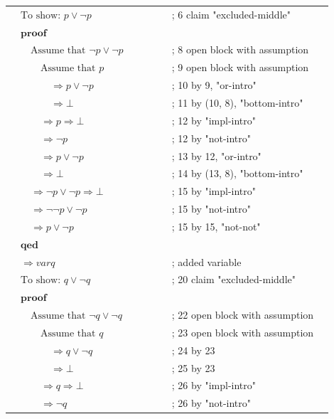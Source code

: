 \documentclass{article}
\begin{document}
\begin{flushleft}
\begin{tabular}{L{0.45\linewidth} L{0.45\linewidth}}

$ \quad \text{To show: } p \lor \lnot p  $ & ; 6 claim "excluded-middle" \\
$ \quad \textbf{proof} $ \\
$ \quad\quad \text{Assume that } \lnot p \lor \lnot p  $ & ; 8 open block with assumption \\
$ \quad\quad\quad \text{Assume that } p $ & ; 9 open block with assumption \\
$ \quad\quad\quad\quad \Rightarrow p \lor \lnot p  $ & ; 10 by 9, "or-intro" \\
$ \quad\quad\quad\quad \Rightarrow \bot $ & ; 11 by (10, 8), "bottom-intro" \\
$ \quad\quad\quad \Rightarrow p \Rightarrow \bot $ & ; 12 by "impl-intro" \\
$ \quad\quad\quad \Rightarrow \lnot p $ & ; 12 by "not-intro" \\
$ \quad\quad\quad \Rightarrow p \lor \lnot p  $ & ; 13 by 12, "or-intro" \\
$ \quad\quad\quad \Rightarrow \bot $ & ; 14 by (13, 8), "bottom-intro" \\
$ \quad\quad \Rightarrow \lnot p \lor \lnot p \Rightarrow \bot $ & ; 15 by "impl-intro" \\
$ \quad\quad \Rightarrow \lnot \lnot p \lor \lnot p  $ & ; 15 by "not-intro" \\
$ \quad\quad \Rightarrow p \lor \lnot p  $ & ; 15 by 15, "not-not" \\
$ \quad \textbf{qed} $ \\
$ \quad \Rightarrow var q $ & ; added variable \\
$ \quad \text{To show: } q \lor \lnot q  $ & ; 20 claim "excluded-middle" \\
$ \quad \textbf{proof} $ \\
$ \quad\quad \text{Assume that } \lnot q \lor \lnot q  $ & ; 22 open block with assumption \\
$ \quad\quad\quad \text{Assume that } q $ & ; 23 open block with assumption \\
$ \quad\quad\quad\quad \Rightarrow q \lor \lnot q  $ & ; 24 by 23 \\
$ \quad\quad\quad\quad \Rightarrow \bot $ & ; 25 by 23 \\
$ \quad\quad\quad \Rightarrow q \Rightarrow \bot $ & ; 26 by "impl-intro" \\
$ \quad\quad\quad \Rightarrow \lnot q $ & ; 26 by "not-intro" \\

\end{tabular}
\end{flushleft}
\end{document}
